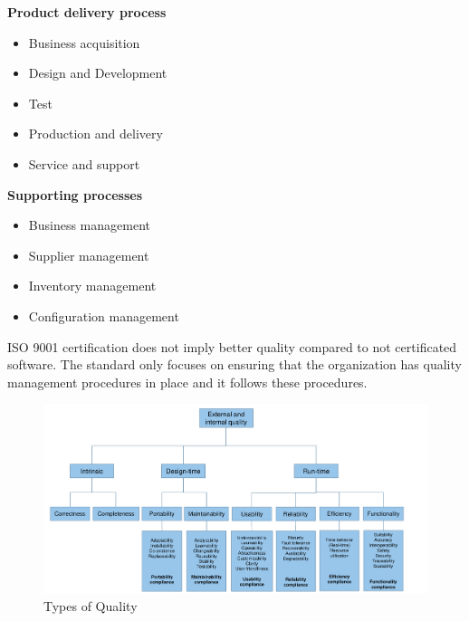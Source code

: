 \begin{minipage}[t]{0.49\textwidth}
    \textbf{Product delivery process}
    \begin{itemize}[topsep=0pt, itemsep=0pt]
        \item Business acquisition
        \item Design and Development
        \item Test
        \item Production and delivery
        \item Service and support
    \end{itemize}
\end{minipage}
\begin{minipage}[t]{0.49\textwidth}
    \textbf{Supporting processes}
    \begin{itemize}[topsep=0pt, itemsep=0pt]
        \item Business management
        \item Supplier management
        \item Inventory management
        \item Configuration management
    \end{itemize}
\end{minipage}
\newline

ISO 9001 certification does not imply better quality compared to not certificated software.
The standard only focuses on ensuring that the organization has quality management procedures in place and it follows these procedures.

\begin{figure}[h]
    \centering
    \includegraphics[width=\linewidth]{images/types_of_quality.png}
    \caption{Types of Quality}\label{fig:se_types_of_quality}
\end{figure}
